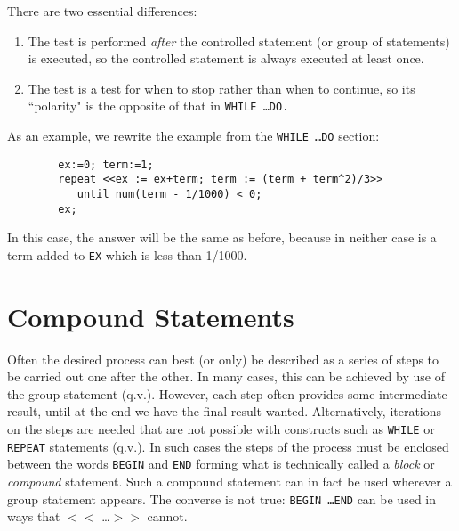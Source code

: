 There are two essential differences:
\begin{enumerate}
\item The test is performed {\em after} the controlled statement (or group of
statements) is executed, so the controlled statement is always executed at
least once.

\item The test is a test for when to stop rather than when to continue, so its
``polarity" is the opposite of that in {\tt WHILE \ldots DO.}
\end{enumerate}

As an example, we rewrite the example from the {\tt WHILE \ldots DO} section:
\begin{verbatim}
        ex:=0; term:=1;
        repeat <<ex := ex+term; term := (term + term^2)/3>>
           until num(term - 1/1000) < 0;
        ex;
\end{verbatim}
In this case, the answer will be the same as before, because in neither
case is a term added to {\tt EX} which is less than 1/1000.

\section{Compound Statements}

Often the desired process can best (or only) be
described as a series of steps to be carried out one after the other.  In
many cases, this can be achieved by use of the group statement (q.v.).  However, each step often provides some intermediate
result, until at the end we have the final result wanted.  Alternatively,
iterations on the steps are needed that are not possible with constructs
such as {\tt WHILE}  or {\tt REPEAT} 
statements (q.v.).  In such cases the steps of the process must be
enclosed between the words {\tt BEGIN} and {\tt END} forming what is technically called a {\em block} or
{\em compound} statement.  Such a compound statement can in fact be used
wherever a group statement appears.  The converse is not true: {\tt BEGIN
\ldots END} can be used in ways that {\tt $<<$} \ldots {\tt $>>$} cannot.

